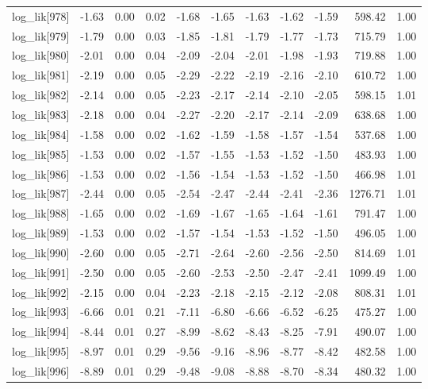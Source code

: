 \begin{table}[ht]
\begin{tabular}{rrrrrrrrrrr}
  log\_lik[978] & -1.63 & 0.00 & 0.02 & -1.68 & -1.65 & -1.63 & -1.62 & -1.59 & 598.42 & 1.00 \\ 
  log\_lik[979] & -1.79 & 0.00 & 0.03 & -1.85 & -1.81 & -1.79 & -1.77 & -1.73 & 715.79 & 1.00 \\ 
  log\_lik[980] & -2.01 & 0.00 & 0.04 & -2.09 & -2.04 & -2.01 & -1.98 & -1.93 & 719.88 & 1.00 \\ 
  log\_lik[981] & -2.19 & 0.00 & 0.05 & -2.29 & -2.22 & -2.19 & -2.16 & -2.10 & 610.72 & 1.00 \\ 
  log\_lik[982] & -2.14 & 0.00 & 0.05 & -2.23 & -2.17 & -2.14 & -2.10 & -2.05 & 598.15 & 1.01 \\ 
  log\_lik[983] & -2.18 & 0.00 & 0.04 & -2.27 & -2.20 & -2.17 & -2.14 & -2.09 & 638.68 & 1.00 \\ 
  log\_lik[984] & -1.58 & 0.00 & 0.02 & -1.62 & -1.59 & -1.58 & -1.57 & -1.54 & 537.68 & 1.00 \\ 
  log\_lik[985] & -1.53 & 0.00 & 0.02 & -1.57 & -1.55 & -1.53 & -1.52 & -1.50 & 483.93 & 1.00 \\ 
  log\_lik[986] & -1.53 & 0.00 & 0.02 & -1.56 & -1.54 & -1.53 & -1.52 & -1.50 & 466.98 & 1.01 \\ 
  log\_lik[987] & -2.44 & 0.00 & 0.05 & -2.54 & -2.47 & -2.44 & -2.41 & -2.36 & 1276.71 & 1.01 \\ 
  log\_lik[988] & -1.65 & 0.00 & 0.02 & -1.69 & -1.67 & -1.65 & -1.64 & -1.61 & 791.47 & 1.00 \\ 
  log\_lik[989] & -1.53 & 0.00 & 0.02 & -1.57 & -1.54 & -1.53 & -1.52 & -1.50 & 496.05 & 1.00 \\ 
  log\_lik[990] & -2.60 & 0.00 & 0.05 & -2.71 & -2.64 & -2.60 & -2.56 & -2.50 & 814.69 & 1.01 \\ 
  log\_lik[991] & -2.50 & 0.00 & 0.05 & -2.60 & -2.53 & -2.50 & -2.47 & -2.41 & 1099.49 & 1.00 \\ 
  log\_lik[992] & -2.15 & 0.00 & 0.04 & -2.23 & -2.18 & -2.15 & -2.12 & -2.08 & 808.31 & 1.01 \\ 
  log\_lik[993] & -6.66 & 0.01 & 0.21 & -7.11 & -6.80 & -6.66 & -6.52 & -6.25 & 475.27 & 1.00 \\ 
  log\_lik[994] & -8.44 & 0.01 & 0.27 & -8.99 & -8.62 & -8.43 & -8.25 & -7.91 & 490.07 & 1.00 \\ 
  log\_lik[995] & -8.97 & 0.01 & 0.29 & -9.56 & -9.16 & -8.96 & -8.77 & -8.42 & 482.58 & 1.00 \\ 
  log\_lik[996] & -8.89 & 0.01 & 0.29 & -9.48 & -9.08 & -8.88 & -8.70 & -8.34 & 480.32 & 1.00 \\ 

\end{tabular}
\end{table}
